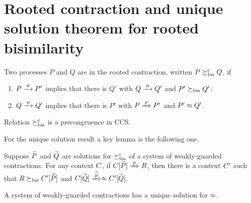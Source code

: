 
\section{Rooted contraction and unique solution theorem for rooted bisimilarity}
\label{ss:new}

\begin{definition}
\label{d:rcontra}
Two processes $P$ and $Q$ are in the rooted contraction, written 
 $P\mathrel{\succeq^{\rm{c}}_{\rm{bis}}} Q$, if
\begin{enumerate}
\item $P \arr\mu P'$ implies that there is $Q'$ with $Q \arr \mu Q'$
 and $P'\mathrel{\succeq_{\rm{bis}}} Q'$;
\item $Q \arr\mu Q'$   implies that there is $P'$ with $P \Arr \mu
 P'$ and $P' \approx Q'$.
\end{enumerate}
\end{definition}

\begin{theorem}
\label{t:rcontr-precongruence}
Relation $\mathrel{\succeq^{\rm{c}}_{\rm{bis}}}$ is a precongruence in CCS. 
\end{theorem}  


For the unique solution result a key lemma is the following one. 

\begin{lemma}
\label{l:uptocon}
Suppose $\widetilde P$ and $\widetilde Q$ are solutions  for $\mathrel{\succeq^{\rm{c}}_{\rm{bis}}}$ 
 of a system of weakly-guarded
contractions.
For any context $C$, 
if  $\ct{\til P}\Arr{\mu}  R$,
 then 
there is a  context $C'$
such that $R \mathrel{\succeq_{\rm{bis}}} C' [\widetilde P]$ and  $\ct{\til Q} \Arcap{\mu}
 \wb \ctp{\til Q}$.
\end{lemma}

\begin{theorem}
\label{t:contra_bisimulation_u}
A system of weakly-guarded contractions
    has 
a unique solution 
 for $\approx$.
\end{theorem} 


